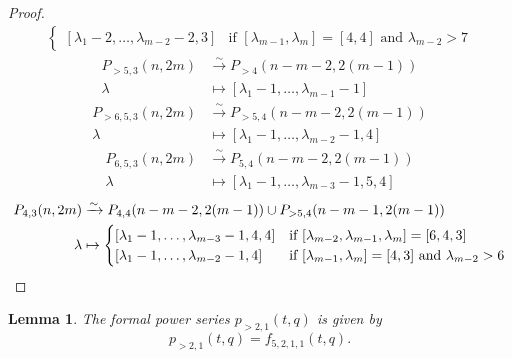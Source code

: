\documentclass[12pt, reqno]{amsart}
\newtheorem{lemma}[theorem]{Lemma}
\theoremstyle{remark}
\begin{document}
\begin{proof}
\begin{align*}
\begin{cases}
                [\lambda_1 - 2, \dots, \lambda_{m - 2} - 2, 3] &\text{if }[\lambda_{m - 1}, \lambda_m] = [4, 4]\text{ and }\lambda_{m - 2} > 7
              \end{cases}
  \end{align*}
  \begin{align*}
    P_{>5, 3}(n, 2m) &\xrightarrow{\sim} P_{>4}(n - m - 2, 2(m - 1)) \\
    \lambda &\mapsto [\lambda_1 - 1, \dots, \lambda_{m - 1} - 1]
  \end{align*}
  \begin{align*}
    P_{>6, 5, 3}(n, 2m) &\xrightarrow{\sim} P_{>5, 4}(n - m - 2, 2(m - 1)) \\
    \lambda &\mapsto [\lambda_1 - 1, \dots, \lambda_{m - 2} - 1, 4]
  \end{align*}
  \begin{align*}
    P_{6, 5, 3}(n, 2m) &\xrightarrow{\sim} P_{5, 4}(n - m - 2, 2(m - 1)) \\
    \lambda &\mapsto [\lambda_1 - 1, \dots, \lambda_{m - 3} - 1, 5, 4]
  \end{align*}
  \begin{align*}
    P_{4, 3}(n, 2m) &\xrightarrow{\sim} P_{4, 4}(n - m - 2, 2(m - 1)) \cup P_{>5, 4}(n - m - 1, 2(m - 1)) \\
    \lambda &\mapsto
              \begin{cases}
                [\lambda_1 - 1, \dots, \lambda_{m - 3} - 1, 4, 4] &\text{if }[\lambda_{m - 2}, \lambda_{m - 1}, \lambda_m] = [6, 4, 3] \\
                [\lambda_1 - 1, \dots, \lambda_{m - 2} - 1, 4] &\text{if }[\lambda_{m - 1}, \lambda_m] = [4, 3]\text{ and }\lambda_{m - 2} > 6 \qedhere
              \end{cases}
  \end{align*}
\end{proof}

\begin{lemma}
  \label{lmm:3}
  The formal power series $p_{>2, 1}(t, q)$ is given by
  \begin{equation*}
    p_{>2, 1}(t, q)=f_{5, 2, 1, 1}(t, q).
  \end{equation*}
\end{lemma}
\end{document}
